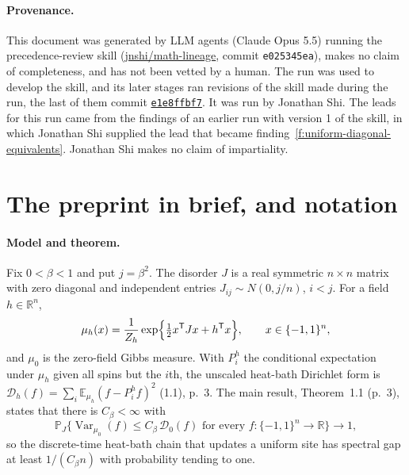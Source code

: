 \documentclass[11pt]{article}
\newcommand{\R}{\mathbb{R}}
\newcommand{\E}{\mathbb{E}}
\renewcommand{\P}{\mathbb{P}}
\newcommand{\D}{\mathcal{D}}
\DeclareMathOperator{\Var}{Var}
\newcommand{\ploc}[2]{#1}
\newcounter{finding}
\begin{document}
\paragraph{Provenance.}
This document was generated by LLM agents (Claude Opus 5.5) running the
precedence-review skill
(\href{https://github.com/jnshi/math-lineage/tree/e025345ea/.agents/skills/precedence-review}{jnshi/math-lineage},
commit \texttt{e025345ea}), makes no claim of completeness, and has not been
vetted by a human. The run was used to develop the skill, and its later stages
ran revisions of the skill made during the run, the last of them commit
\href{https://github.com/jnshi/math-lineage/tree/e1e8ffbf7/.agents/skills/precedence-review}{\texttt{e1e8ffbf7}}.
It was run by Jonathan Shi. The leads for this run came from the findings of
an earlier run with version 1 of the skill, in which Jonathan Shi supplied the
lead that became finding~\ref{f:uniform-diagonal-equivalents}. Jonathan Shi
makes no claim of impartiality.
\space%
\section{The preprint in brief, and notation}\label{sec:overview}

\paragraph{Model and theorem.}
Fix $0<\beta<1$ and put $j=\beta^2$. The disorder $J$ is a real symmetric
$n\times n$ matrix with zero diagonal and independent entries
$J_{ij}\sim N(0,j/n)$, $i<j$. For a field $h\in\R^n$,
\[
 \mu_h(x)=\frac{1}{Z_h}\exp\Bigl\{\tfrac12x^{\mathsf T}Jx+h^{\mathsf T}x\Bigr\},
 \qquad x\in\{-1,1\}^n,
\]
and $\mu_0$ is the zero-field Gibbs measure. With $P_i^h$ the conditional
expectation under $\mu_h$ given all spins but the $i$th, the unscaled
heat-bath Dirichlet form is
$\D_h(f)=\sum_{i}\E_{\mu_h}(f-P_i^hf)^2$ \ploc{(1.1), p.~3}{introduction.tex:22--24}.
The main result, \ploc{Theorem~1.1 (p.~3)}{introduction.tex:33--42}, states
that there is $C_\beta<\infty$ with
\[
 \P_J\bigl\{\Var_{\mu_0}(f)\le C_\beta\,\D_0(f)\text{ for every }f:\{-1,1\}^n\to\R\bigr\}\longrightarrow1,
\]
so the discrete-time heat-bath chain that updates a uniform site has
spectral gap at least $1/(C_\beta n)$ with probability tending to one.
\end{document}

